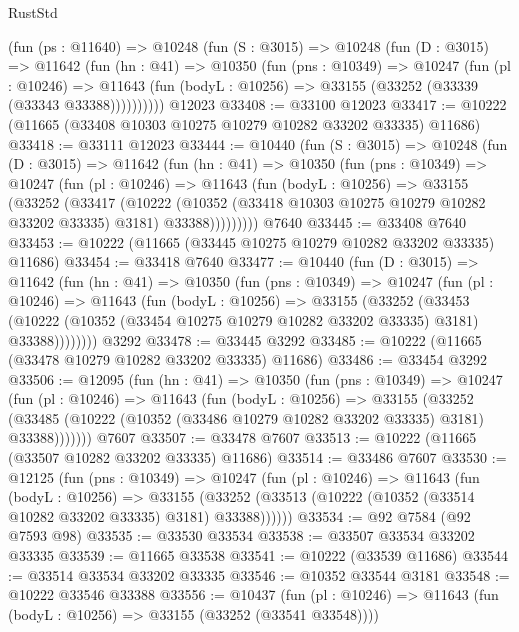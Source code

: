 \begin{lexlean}{RustStd}
\begin{coremodule}
    (fun (ps : @11640) =>
    @10248
      (fun (S : @3015) =>
      @10248
        (fun (D : @3015) =>
        @11642
          (fun (hn : @41) =>
          @10350
            (fun (pns : @10349) =>
            @10247
              (fun (pl : @10246) =>
              @11643 (fun (bodyL : @10256) => @33155 (@33252 (@33339 (@33343 @33388))))))))))
    @12023
@33408 := @33100 @12023
@33417 := @10222 (@11665 (@33408 @10303 @10275 @10279 @10282 @33202 @33335) @11686)
@33418 := @33111 @12023
@33444 := @10440
    (fun (S : @3015) =>
    @10248
      (fun (D : @3015) =>
      @11642
        (fun (hn : @41) =>
        @10350
          (fun (pns : @10349) =>
          @10247
            (fun (pl : @10246) =>
            @11643
              (fun (bodyL : @10256) =>
              @33155
                (@33252
                  (@33417
                    (@10222
                      (@10352 (@33418 @10303 @10275 @10279 @10282 @33202 @33335) @3181)
                      @33388)))))))))
    @7640
@33445 := @33408 @7640
@33453 := @10222 (@11665 (@33445 @10275 @10279 @10282 @33202 @33335) @11686)
@33454 := @33418 @7640
@33477 := @10440
    (fun (D : @3015) =>
    @11642
      (fun (hn : @41) =>
      @10350
        (fun (pns : @10349) =>
        @10247
          (fun (pl : @10246) =>
          @11643
            (fun (bodyL : @10256) =>
            @33155
              (@33252
                (@33453
                  (@10222 (@10352 (@33454 @10275 @10279 @10282 @33202 @33335) @3181) @33388))))))))
    @3292
@33478 := @33445 @3292
@33485 := @10222 (@11665 (@33478 @10279 @10282 @33202 @33335) @11686)
@33486 := @33454 @3292
@33506 := @12095
    (fun (hn : @41) =>
    @10350
      (fun (pns : @10349) =>
      @10247
        (fun (pl : @10246) =>
        @11643
          (fun (bodyL : @10256) =>
          @33155
            (@33252
              (@33485 (@10222 (@10352 (@33486 @10279 @10282 @33202 @33335) @3181) @33388)))))))
    @7607
@33507 := @33478 @7607
@33513 := @10222 (@11665 (@33507 @10282 @33202 @33335) @11686)
@33514 := @33486 @7607
@33530 := @12125
    (fun (pns : @10349) =>
    @10247
      (fun (pl : @10246) =>
      @11643
        (fun (bodyL : @10256) =>
        @33155 (@33252 (@33513 (@10222 (@10352 (@33514 @10282 @33202 @33335) @3181) @33388))))))
@33534 := @92 @7584 (@92 @7593 @98)
@33535 := @33530 @33534
@33538 := @33507 @33534 @33202 @33335
@33539 := @11665 @33538
@33541 := @10222 (@33539 @11686)
@33544 := @33514 @33534 @33202 @33335
@33546 := @10352 @33544 @3181
@33548 := @10222 @33546 @33388
@33556 := @10437
    (fun (pl : @10246) => @11643 (fun (bodyL : @10256) => @33155 (@33252 (@33541 @33548))))

\end{coremodule}
\end{lexlean}
